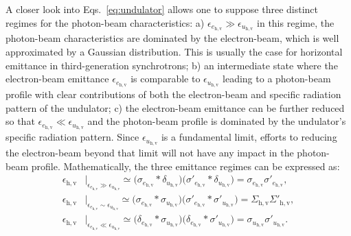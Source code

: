 \begin{refsection}
A closer look into Eqs.~\ref{eq:undulator} allows one to suppose three distinct regimes for the photon-beam characteristics: a) $\epsilon_{e_{\mathrm{h,v}}}\gg\epsilon_{u_{\mathrm{h,v}}}$ in this regime, the photon-beam characteristics are dominated by the electron-beam, which is well approximated by a Gaussian distribution. This is usually the case for horizontal emittance in third-generation synchrotrons; b) an intermediate state where the electron-beam emittance $\epsilon_{e_{\mathrm{h,v}}}$ is comparable to $\epsilon_{u_{\mathrm{h,v}}}$ leading to a photon-beam profile with clear contributions of both the electron-beam and specific radiation pattern of the undulator; c) the electron-beam emittance can be further reduced so that $\epsilon_{e_{\mathrm{h,v}}}\ll\epsilon_{u_{\mathrm{h,v}}}$ and the photon-beam profile is dominated by the undulator's specific radiation pattern. Since $\epsilon_{u_{\mathrm{h,v}}}$ is a fundamental limit, efforts to reducing the electron-beam beyond that limit will not have any impact in the photon-beam profile. Mathematically, the three emittance regimes can be expressed as:
\begin{subequations}\label{eq:emittances}
    \begin{align}
           \epsilon_{\mathrm{h,v}}&\Big\vert_{\epsilon_{e_{\mathrm{h,v}}}\gg\epsilon_{u_{\mathrm{h,v}}}}  \simeq\Big(\sigma_{e_{\mathrm{h,v}}}*\delta_{u_{\mathrm{h,v}}}\Big)\Big(\sigma'_{e_{\mathrm{h,v}}}*\delta_{u_{\mathrm{h,v}}}\Big)=\sigma_{e_{\mathrm{h,v}}}\sigma'_{e_{\mathrm{h,v}}},\\
           \epsilon_{\mathrm{h,v}}&\Big\vert_{\epsilon_{e_{\mathrm{h,v}}}\sim\epsilon_{u_{\mathrm{h,v}}}}
           \simeq\Big(\sigma_{e_{\mathrm{h,v}}}*\sigma_{u_{\mathrm{h,v}}}\Big)\Big(\sigma'_{e_{\mathrm{h,v}}}*\sigma'_{u_{\mathrm{h,v}}}\Big)=\Sigma_{\mathrm{h,v}}\Sigma'_{\mathrm{h,v}},\\
           \epsilon_{\mathrm{h,v}}&\Big\vert_{\epsilon_{e_{\mathrm{h,v}}}\ll\epsilon_{u_{\mathrm{h,v}}}}
           \simeq \Big(\delta_{e_{\mathrm{h,v}}}*\sigma_{u_{\mathrm{h,v}}}\Big)\Big(\delta_{e_{\mathrm{h,v}}}*\sigma'_{u_{\mathrm{h,v}}}\Big)=\sigma_{u_{\mathrm{h,v}}}\sigma'_{u_{\mathrm{h,v}}}.
    \end{align}
\end{subequations}{}

\end{refsection}
